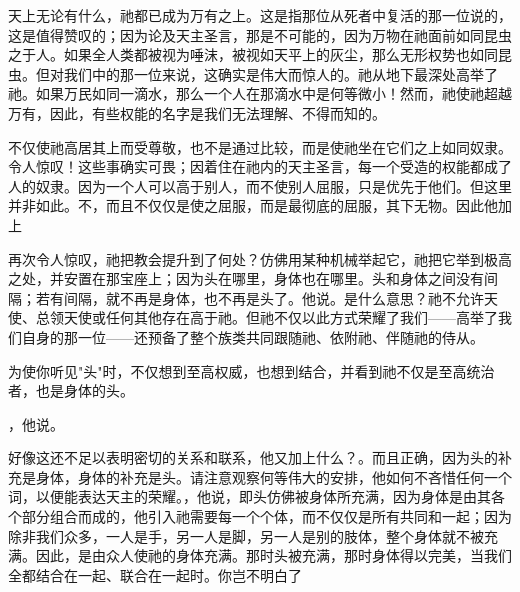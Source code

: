 \par

天上无论有什么，祂都已成为万有之上。这是指那位从死者中复活的那一位说的，这是值得赞叹的；因为论及天主圣言，那是不可能的，因为万物在祂面前如同昆虫之于人。如果全人类都被视为唾沫，被视如天平上的灰尘，那么无形权势也如同昆虫。但对我们中的那一位来说，这确实是伟大而惊人的。祂从地下最深处高举了祂。如果万民如同一滴水，那么一个人在那滴水中是何等微小！然而，祂使祂超越万有，因此，有些权能的名字是我们无法理解、不得而知的。\par

\par

不仅使祂高居其上而受尊敬，也不是通过比较，而是使祂坐在它们之上如同奴隶。令人惊叹！这些事确实可畏；因着住在祂内的天主圣言，每一个受造的权能都成了人的奴隶。因为一个人可以高于别人，而不使别人屈服，只是优先于他们。但这里并非如此。不，而且不仅仅是使之屈服，而是最彻底的屈服，其下无物。因此他加上\par

\par

再次令人惊叹，祂把教会提升到了何处？仿佛用某种机械举起它，祂把它举到极高之处，并安置在那宝座上；因为头在哪里，身体也在哪里。头和身体之间没有间隔；若有间隔，就不再是身体，也不再是头了。他说。是什么意思？祂不允许天使、总领天使或任何其他存在高于祂。但祂不仅以此方式荣耀了我们——高举了我们自身的那一位——还预备了整个族类共同跟随祂、依附祂、伴随祂的侍从。\par

\par

为使你听见"头"时，不仅想到至高权威，也想到结合，并看到祂不仅是至高统治者，也是身体的头。\par

，他说。\par

好像这还不足以表明密切的关系和联系，他又加上什么？。而且正确，因为头的补充是身体，身体的补充是头。请注意观察何等伟大的安排，他如何不吝惜任何一个词，以便能表达天主的荣耀。，他说，即头仿佛被身体所充满，因为身体是由其各个部分组合而成的，他引入祂需要每一个个体，而不仅仅是所有共同和一起；因为除非我们众多，一人是手，另一人是脚，另一人是别的肢体，整个身体就不被充满。因此，是由众人使祂的身体充满。那时头被充满，那时身体得以完美，当我们全都结合在一起、联合在一起时。你岂不明白了\par

